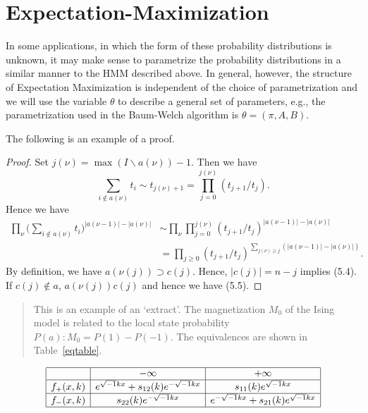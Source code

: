 \documentclass{amsart}
\theoremstyle{definition}
\theoremstyle{remark}
\numberwithin{equation}{section}
\newcommand{\abs}[1]{\lvert#1\rvert}
\begin{document}
\section{Expectation-Maximization}
In some applications, in which the form of these probability distributions is unknown, it may make sense to parametrize the probability distributions in a similar manner to the HMM described above. In general, however, the structure of Expectation Maximization is independent of the choice of parametrization and we will use the variable $\theta$ to describe a general set of parameters, e.g., the parametrization used in the Baum-Welch algorithm is $\theta = (\pi,A,B)$.




The following is an example of a proof.

\begin{proof} Set $j(\nu)=\max(I\backslash a(\nu))-1$. Then we have
\[
\sum_{i\notin a(\nu)}t_i\sim t_{j(\nu)+1}
  =\prod^{j(\nu)}_{j=0}(t_{j+1}/t_j).
\]
Hence we have
\begin{equation}
\begin{split}
\prod_\nu\biggl(\sum_{i\notin
  a(\nu)}t_i\biggr)^{\abs{a(\nu-1)}-\abs{a(\nu)}}
&\sim\prod_\nu\prod^{j(\nu)}_{j=0}
  (t_{j+1}/t_j)^{\abs{a(\nu-1)}-\abs{a(\nu)}}\\
&=\prod_{j\ge 0}(t_{j+1}/t_j)^{
  \sum_{j(\nu)\ge j}(\abs{a(\nu-1)}-\abs{a(\nu)})}.
\end{split}
\end{equation}
By definition, we have $a(\nu(j))\supset c(j)$. Hence, $\abs{c(j)}=n-j$
implies (5.4). If $c(j)\notin a$, $a(\nu(j))c(j)$ and hence
we have (5.5).
\end{proof}

\begin{quotation}
This is an example of an `extract'. The magnetization $M_0$ of the Ising
model is related to the local state probability $P(a):M_0=P(1)-P(-1)$.
The equivalences are shown in Table~\ref{eqtable}.
\end{quotation}

\begin{table}[ht]
\caption{}\label{eqtable}
\renewcommand\arraystretch{1.5}
\noindent\[
\begin{array}{|c|c|c|}
\hline
&{-\infty}&{+\infty}\\
\hline
{f_+(x,k)}&e^{\sqrt{-1}kx}+s_{12}(k)e^{-\sqrt{-1}kx}&s_{11}(k)e^
{\sqrt{-1}kx}\\
\hline
{f_-(x,k)}&s_{22}(k)e^{-\sqrt{-1}kx}&e^{-\sqrt{-1}kx}+s_{21}(k)e^{\sqrt
{-1}kx}\\
\hline
\end{array}
\]
\end{table}
\end{document}
